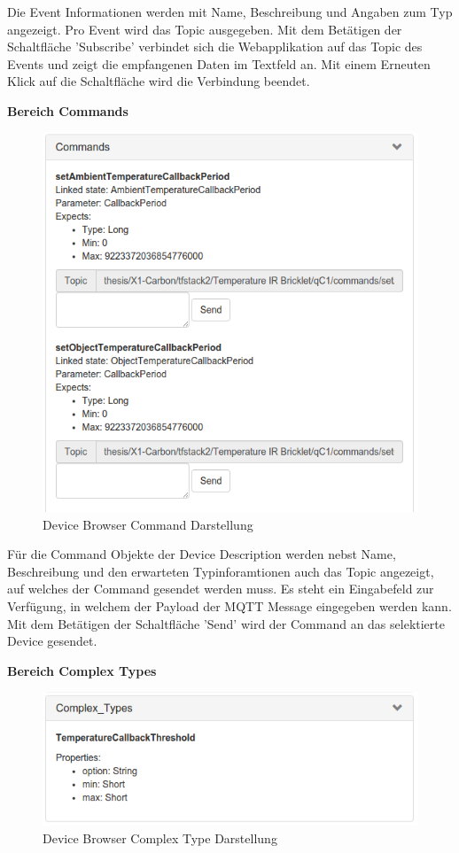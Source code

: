{Die Event Informationen werden mit Name, Beschreibung und Angaben zum Typ angezeigt. Pro Event wird das Topic ausgegeben. Mit dem Betätigen der Schaltfläche 'Subscribe' verbindet sich die Webapplikation auf das Topic des Events und zeigt die empfangenen Daten im Textfeld an. Mit einem Erneuten Klick auf die Schaltfläche wird die Verbindung beendet.

\newpage
\textbf{Bereich Commands}

\begin{figure}[H]
	\centering
        \includegraphics[width=0.7\linewidth]{bilder/device_browser_commands.png} 
    \caption{Device Browser Command Darstellung}
\end{figure}

Für die Command Objekte der Device Description werden nebst Name, Beschreibung und den erwarteten Typinforamtionen auch das Topic angezeigt, auf welches der Command gesendet werden muss. Es steht ein Eingabefeld zur Verfügung, in welchem der Payload der MQTT Message eingegeben werden kann. Mit dem Betätigen der Schaltfläche 'Send' wird der Command an das selektierte Device gesendet.


\textbf{Bereich Complex Types} \\
\begin{figure}[H]
	\centering
        \includegraphics[width=0.7\linewidth]{bilder/device_browser_comptypes.png} 
    \caption{Device Browser Complex Type Darstellung}
\end{figure}

}
